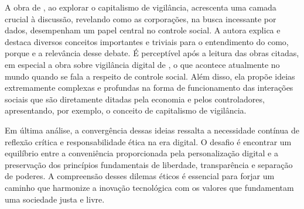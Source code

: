 \documentclass[
	12pt,
	openright,
	twoside,
	a4paper,
	english,
	french,
	spanish,
	brazil
]{abntex2}
\begin{document}
  A obra de , ao explorar o
  capitalismo de vigilância, acrescenta uma camada crucial à discussão,
  revelando como as corporações, na busca incessante por dados, desempenham um
  papel central no controle social. A autora explica e destaca diversos
  conceitos importantes e triviais para o entendimento do como, porque e a
  relevância desse debate. É perceptível após a leitura das obras citadas, em
  especial a obra sobre vigilância digital de
  , o que acontece atualmente no
  mundo quando se fala a respeito de controle social. Além disso, ela propõe
  ideias extremamente complexas e profundas na forma de funcionamento das
  interações sociais que são diretamente ditadas pela economia e pelos
  controladores, apresentando, por exemplo, o conceito de capitalismo de
  vigilância.

  Em última análise, a convergência dessas ideias ressalta a necessidade
  contínua de reflexão crítica e responsabilidade ética na era digital. O
  desafio é encontrar um equilíbrio entre a conveniência proporcionada pela
  personalização digital e a preservação dos princípios fundamentais de
  liberdade, transparência e separação de poderes. A compreensão desses dilemas
  éticos é essencial para forjar um caminho que harmonize a inovação tecnológica
  com os valores que fundamentam uma sociedade justa e livre.

  \postextual

  
\end{document}
